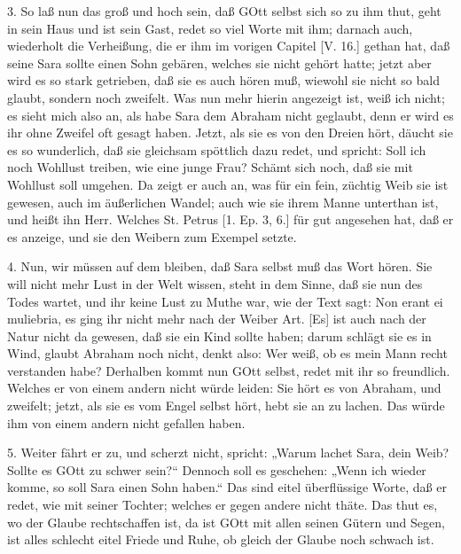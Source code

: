 3. So laß nun das groß und hoch sein, daß GOtt selbst sich so zu ihm thut, geht in sein Haus und ist sein Gast, redet so viel Worte mit ihm; darnach auch, wiederholt die Verheißung, die er ihm im vorigen Capitel [V. 16.] gethan hat, daß seine Sara sollte einen Sohn gebären, welches sie nicht gehört hatte; jetzt aber wird es so stark getrieben, daß sie es auch hören muß, wiewohl sie nicht so bald glaubt, sondern noch zweifelt. Was nun mehr hierin angezeigt ist, weiß ich nicht; es sieht mich also an, als habe Sara dem Abraham nicht geglaubt, denn er wird es ihr ohne Zweifel oft gesagt haben. Jetzt, als sie es von den Dreien hört, däucht sie es so wunderlich, daß sie gleichsam spöttlich dazu redet, und spricht: Soll ich noch Wohllust treiben, wie eine junge Frau? Schämt sich noch, daß sie mit Wohllust soll umgehen. Da zeigt er auch an, was für ein fein, züchtig Weib sie ist gewesen, auch im äußerlichen Wandel; auch wie sie ihrem Manne unterthan ist, und heißt ihn Herr. Welches St. Petrus [1. Ep. 3, 6.] für gut angesehen hat, daß er es anzeige, und sie den Weibern zum Exempel setzte.

4. Nun, wir müssen auf dem bleiben, daß Sara selbst muß das Wort hören. Sie will
nicht mehr Lust in der Welt wissen, steht in dem Sinne, daß sie nun des Todes wartet, und ihr keine Lust zu Muthe war, wie der Text sagt: Non erant ei muliebria, es ging ihr nicht mehr nach der Weiber Art. [Es] ist auch nach der Natur nicht da gewesen, daß sie ein Kind sollte haben; darum schlägt sie es in Wind, glaubt Abraham noch nicht, denkt also: Wer weiß, ob es mein Mann recht verstanden habe? Derhalben kommt nun GOtt selbst, redet mit ihr so freundlich. Welches er von einem andern nicht würde leiden: Sie hört es von Abraham, und zweifelt; jetzt, als sie es vom Engel selbst hört, hebt sie an zu lachen. Das würde ihm von einem andern nicht gefallen haben.

5. Weiter fährt er zu, und scherzt nicht, spricht: „Warum lachet Sara, dein Weib? Sollte es GOtt zu schwer sein?“ Dennoch soll es geschehen: „Wenn ich wieder komme, so soll Sara einen Sohn haben.“ Das sind eitel überflüssige Worte, daß er redet, wie mit seiner Tochter; welches er gegen andere nicht thäte. Das thut es, wo der Glaube rechtschaffen ist, da ist GOtt mit allen seinen Gütern und Segen, ist alles schlecht eitel Friede und Ruhe, ob gleich der Glaube noch schwach ist.

